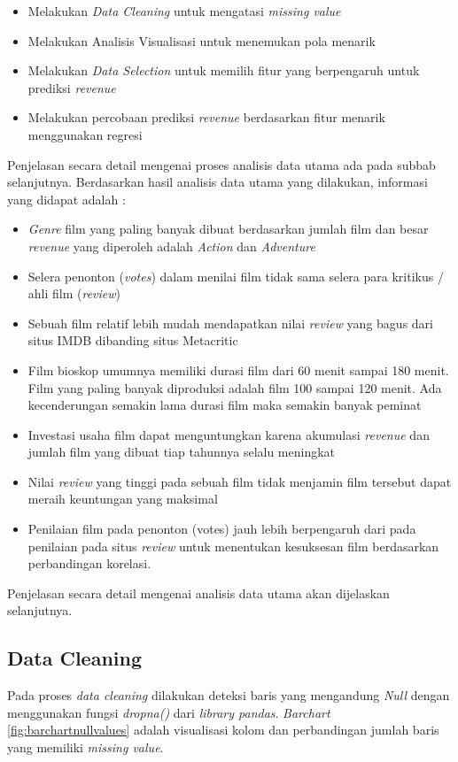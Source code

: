 \begin{itemize}
\item Melakukan \textit{Data Cleaning} untuk mengatasi \textit{missing value}
\item Melakukan Analisis Visualisasi untuk menemukan pola menarik 
\item Melakukan \textit{Data Selection}
untuk memilih fitur yang berpengaruh untuk prediksi \textit{revenue}
\item Melakukan percobaan prediksi \textit{revenue} berdasarkan fitur menarik menggunakan regresi
\end{itemize}



Penjelasan secara detail mengenai proses analisis data utama ada pada subbab selanjutnya. Berdasarkan hasil analisis data utama yang dilakukan, informasi yang didapat adalah :

\begin{itemize}
\item \textit{Genre} film yang paling banyak dibuat berdasarkan jumlah film dan besar \textit{revenue} yang diperoleh adalah \textit{Action} dan \textit{Adventure} 
\item Selera penonton (\textit{votes}) dalam menilai film tidak sama selera para kritikus / ahli film (\textit{review})
\item Sebuah film relatif lebih mudah mendapatkan nilai \textit{review} yang bagus dari situs IMDB dibanding situs Metacritic
\item Film bioskop umumnya memiliki durasi film dari 60 menit sampai 180 menit. Film yang paling banyak diproduksi adalah film 100 sampai 120 menit. Ada kecenderungan semakin lama durasi film maka semakin banyak peminat
\item Investasi usaha film dapat menguntungkan karena akumulasi \textit{revenue} dan jumlah film yang dibuat tiap tahunnya selalu meningkat 
\item Nilai \textit{review} yang tinggi pada sebuah film tidak menjamin film tersebut dapat meraih keuntungan yang maksimal
\item Penilaian film pada penonton (votes) jauh lebih berpengaruh dari pada penilaian pada situs \textit{review} untuk menentukan kesuksesan film berdasarkan perbandingan korelasi.
\end{itemize}


Penjelasan secara detail mengenai analisis data utama akan dijelaskan selanjutnya.

\subsection{Data Cleaning} 
Pada proses \textit{data cleaning} dilakukan deteksi baris yang mengandung \textit{Null} dengan menggunakan fungsi \textit{dropna()} dari \textit{library pandas}. \textit{Barchart} \ref{fig:barchartnullvalues} adalah visualisasi kolom dan perbandingan jumlah baris yang memiliki \textit{missing value}.

